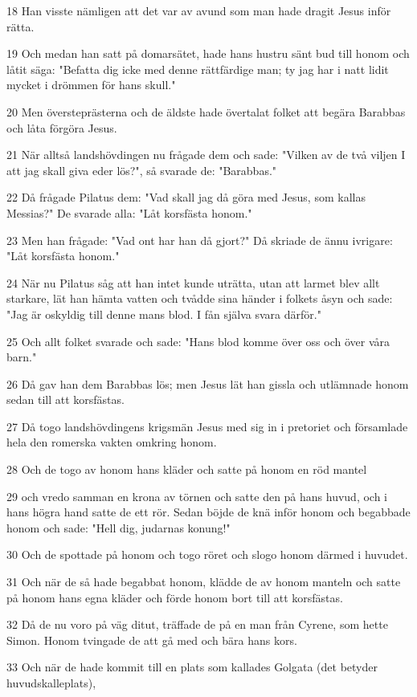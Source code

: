 \par 18 Han visste nämligen att det var av avund som man hade dragit Jesus inför rätta.
\par 19 Och medan han satt på domarsätet, hade hans hustru sänt bud till honom och låtit säga: "Befatta dig icke med denne rättfärdige man; ty jag har i natt lidit mycket i drömmen för hans skull."
\par 20 Men översteprästerna och de äldste hade övertalat folket att begära Barabbas och låta förgöra Jesus.
\par 21 När alltså landshövdingen nu frågade dem och sade: "Vilken av de två viljen I att jag skall giva eder lös?", så svarade de: "Barabbas."
\par 22 Då frågade Pilatus dem: "Vad skall jag då göra med Jesus, som kallas Messias?" De svarade alla: "Låt korsfästa honom."
\par 23 Men han frågade: "Vad ont har han då gjort?" Då skriade de ännu ivrigare: "Låt korsfästa honom."
\par 24 När nu Pilatus såg att han intet kunde uträtta, utan att larmet blev allt starkare, lät han hämta vatten och tvådde sina händer i folkets åsyn och sade: "Jag är oskyldig till denne mans blod. I fån själva svara därför."
\par 25 Och allt folket svarade och sade: "Hans blod komme över oss och över våra barn."
\par 26 Då gav han dem Barabbas lös; men Jesus lät han gissla och utlämnade honom sedan till att korsfästas.
\par 27 Då togo landshövdingens krigsmän Jesus med sig in i pretoriet och församlade hela den romerska vakten omkring honom.
\par 28 Och de togo av honom hans kläder och satte på honom en röd mantel
\par 29 och vredo samman en krona av törnen och satte den på hans huvud, och i hans högra hand satte de ett rör. Sedan böjde de knä inför honom och begabbade honom och sade: "Hell dig, judarnas konung!"
\par 30 Och de spottade på honom och togo röret och slogo honom därmed i huvudet.
\par 31 Och när de så hade begabbat honom, klädde de av honom manteln och satte på honom hans egna kläder och förde honom bort till att korsfästas.
\par 32 Då de nu voro på väg ditut, träffade de på en man från Cyrene, som hette Simon. Honom tvingade de att gå med och bära hans kors.
\par 33 Och när de hade kommit till en plats som kallades Golgata (det betyder huvudskalleplats),
